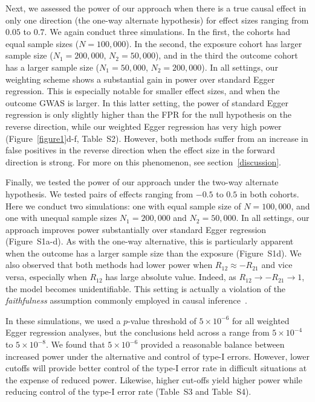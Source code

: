 \documentclass{article}
\begin{document}
Next, we assessed the power of our approach when there is a true causal effect in only one direction (the one-way alternate
hypothesis) for effect sizes ranging from $0.05$ to $0.7$. We again conduct three simulations.
In the first, the cohorts had equal sample sizes ($N = 100,000$). In the second, the exposure
cohort has larger sample size ($N_1 = 200,000$, $N_2 = 50,000$),
and in the third the outcome cohort has a larger sample size ($N_1 = 50,000$, $N_2 = 200,000$).
In all settings, our weighting scheme shows
a substantial gain in power over standard Egger regression. This is especially
notable for smaller effect sizes, and when the outcome GWAS is larger.
In this latter setting, the power of standard Egger regression is only slightly
higher than the FPR for the null hypothesis on the reverse direction,
while our weighted Egger regression has very high power
(Figure~\ref{figure1}d-f, Table~S2). However, both
methods suffer from an increase in false positives in the reverse direction
when the effect size in the forward direction is strong. For more on this
phenomenon, see section~\ref{discussion}.

Finally, we tested the power of our approach under the two-way alternate
hypothesis. We tested pairs of effects ranging from $-0.5$ to $0.5$ in both cohorts.
Here we conduct two simulations: one with equal sample size of $N=100,000$,
and one with unequal sample sizes $N_1 = 200,000$ and $N_2 = 50,000$.
In all settings, our approach improves power
substantially over standard Egger regression (Figure~S1a-d). As with
the one-way alternative, this is particularly apparent when the outcome has a larger
sample size than the exposure (Figure~S1d). We also observed that both
methods had lower power when $R_{12} \approx -R_{21}$ and vice versa, especially when
$R_{12}$ has large absolute value. Indeed, as $R_{12} \rightarrow -R_{21} \rightarrow 1$, the model
becomes unidentifiable. This setting is actually a violation of the \emph{faithfulness}
assumption commonly employed in causal inference~\cite{Pearl2000}.

In these simulations, we used a $p$-value threshold of $5\times 10^{-6}$
for all weighted Egger regression analyses, but the conclusions held across a range
from $5\times 10^{-4}$ to $5\times 10^{-8}$. We found that
$5\times 10^{-6}$ provided a reasonable balance between increased power under 
the alternative and control of type-I errors. However, lower
cutoffs will provide better control of the type-I error rate in difficult situations
at the expense of reduced power. Likewise, higher cut-offs yield higher power
while reducing control of the type-I error rate
(Table~S3 and Table~S4). 
\end{document}
